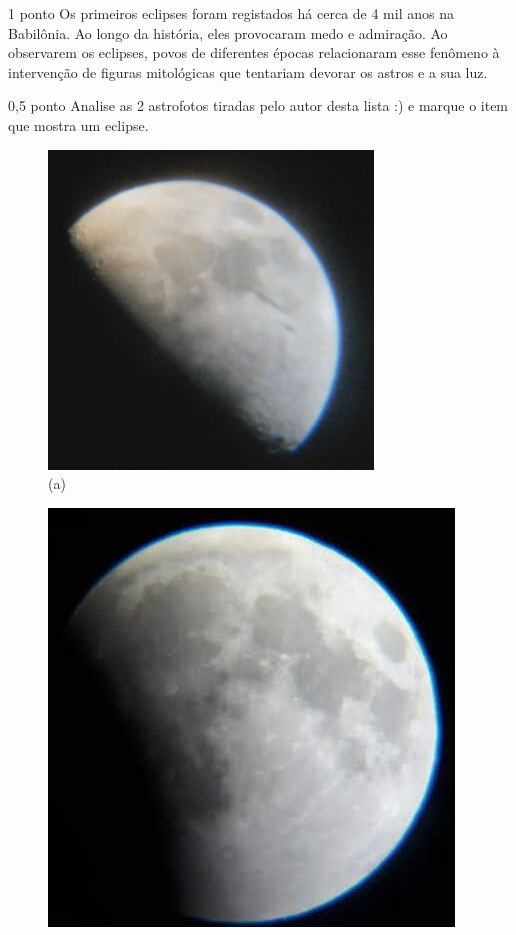 \documentclass{../lista}
\begin{document}

	\begin{questao}{1 ponto}
		Os primeiros eclipses foram registados há cerca de 4 mil anos na Babilônia. Ao longo da história, eles provocaram medo e admiração. Ao observarem os eclipses, povos de diferentes épocas relacionaram esse fenômeno à intervenção de figuras mitológicas que tentariam devorar os astros e a sua luz.

		\begin{pergunta}{0,5 ponto}
			Analise as 2 astrofotos tiradas pelo autor desta lista :) e marque o item que mostra um eclipse.
			\begin{multicols}{2}
				\begin{figure}[H]
					\centering
					\includegraphics[width=.6\linewidth]{./img/1a.png}
					\captionsetup{labelformat=empty}
					\caption{(a)}
				\end{figure}
				\begin{figure}[H]
					\centering
					\includegraphics[width=.6\linewidth]{./img/1b.jpg}

\end{figure}
\end{multicols}
\end{pergunta}
\end{questao}
\end{document}
